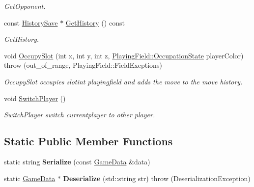 \begin{DoxyCompactItemize}
\begin{DoxyCompactList}\small\item\em Get\-Opponent. \end{DoxyCompactList}\item 
const \hyperlink{classHistorySave}{History\-Save} $\ast$ \hyperlink{classGameData_ad0e34ba7f1106ff9b5fdd8e99f327ec1}{Get\-History} () const 
\begin{DoxyCompactList}\small\item\em Get\-History. \end{DoxyCompactList}\item 
void \hyperlink{classGameData_a5e1d9b00d89fea74a17e653057b47541}{Occupy\-Slot} (int x, int y, int z, \hyperlink{classPlayingField_ac6df152a3f820aa04a00ab4df4a9d265}{Playing\-Field\-::\-Occupation\-State} player\-Color)  throw (out\-\_\-of\-\_\-range, Playing\-Field\-::\-Field\-Exeptions)
\begin{DoxyCompactList}\small\item\em Occupy\-Slot occupies slotint playingfield and adds the move to the move history. \end{DoxyCompactList}\item 
\hypertarget{classGameData_a18924e62415d38e1651ef1ab7d488996}{void \hyperlink{classGameData_a18924e62415d38e1651ef1ab7d488996}{Switch\-Player} ()}\label{classGameData_a18924e62415d38e1651ef1ab7d488996}

\begin{DoxyCompactList}\small\item\em Switch\-Player switch currentplayer to other player. \end{DoxyCompactList}\end{DoxyCompactItemize}
\subsection*{Static Public Member Functions}
\begin{DoxyCompactItemize}
\item 
\hypertarget{classGameData_a5f923199f27169c1c3aa0e4276153fc5}{static string {\bfseries Serialize} (const \hyperlink{classGameData}{Game\-Data} \&data)}\label{classGameData_a5f923199f27169c1c3aa0e4276153fc5}

\item 
\hypertarget{classGameData_a11cecb1c8a834e0928ec5f554d7e9d89}{static \hyperlink{classGameData}{Game\-Data} $\ast$ {\bfseries Deserialize} (std\-::string str)  throw (\-Deserialization\-Exception)}\label{classGameData_a11cecb1c8a834e0928ec5f554d7e9d89}

\end{DoxyCompactItemize}


